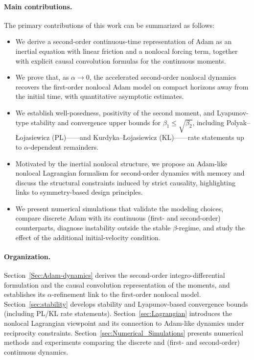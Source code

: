 \documentclass{article} %
\begin{document}
\paragraph{Main contributions.}
The primary contributions of this work can be summarized as follows:
\begin{itemize}
  \item We derive a second-order continuous-time representation of Adam as an inertial equation with linear friction and a nonlocal forcing term, together with explicit causal convolution formulas for the continuous moments.
  \item We prove that, as $\alpha\to 0$, the accelerated second-order nonlocal dynamics recovers the first-order nonlocal Adam model on compact horizons away from the initial time, with quantitative asymptotic estimates.
  \item We establish well-posedness, positivity of the second moment, and Lyapunov-type stability and convergence upper bounds for $\beta_1 \le \sqrt{\beta_2}$, including Polyak–Łojasiewicz (PL)---\cite{PL}---and Kurdyka–Łojasiewicz (KL)---\cite{KL}---rate statements up to $\alpha$-dependent remainders.
  \item Motivated by the inertial nonlocal structure, we propose an Adam-like nonlocal Lagrangian formalism for second-order dynamics with memory and discuss the structural constraints induced by strict causality, highlighting links to symmetry-based design principles.
  \item We present numerical simulations that validate the modeling choices, compare discrete Adam with its continuous (first- and second-order) counterparts, diagnose instability outside the stable $\beta$-regime, and study the effect of the additional initial-velocity condition.
\end{itemize}

\paragraph{Organization.}
Section~\ref{Sec:Adam-dynamics} derives the second-order integro-differential formulation and the causal convolution representation of the moments, and establishes its $\alpha$-refinement link to the first-order nonlocal model. Section~\ref{sec:stability} develops stability and Lyapunov-based convergence bounds (including PL/KL rate statements). Section~\ref{sec:Lagrangian} introduces the nonlocal Lagrangian viewpoint and its connection to Adam-like dynamics under reciprocity constraints. Section~\ref{sec:Numerical_Simulations} presents numerical methods and experiments comparing the discrete and (first- and second-order) continuous dynamics.
\end{document}
